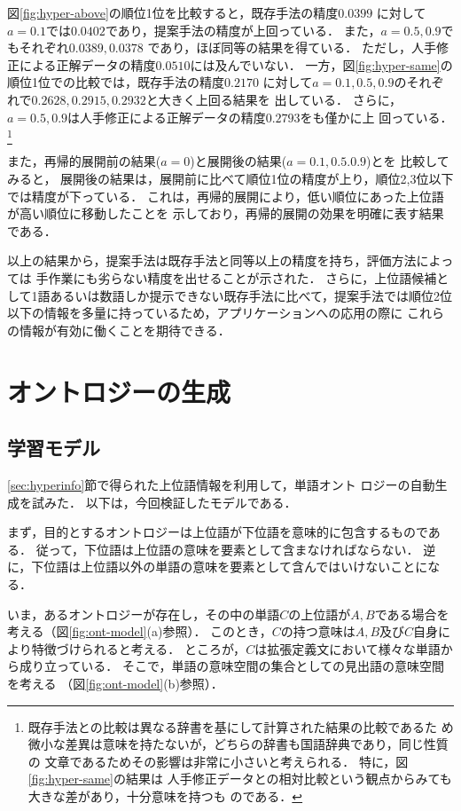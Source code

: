 \documentclass[japanese]{jnlp_1.4}
\begin{document}
図\ref{fig:hyper-above}の順位1位を比較すると，既存手法の精度$0.0399$
に対して$a=0.1$では$0.0402$であり，提案手法の精度が上回っている．
また，$a=0.5,0.9$でもそれぞれ$0.0389,0.0378$
であり，ほぼ同等の結果を得ている．
ただし，人手修正による正解データの精度$0.0510$には及んでいない．
一方，図\ref{fig:hyper-same}の順位1位での比較では，既存手法の精度$0.2170$
に対して$a=0.1,0.5,0.9$のそれぞれで$0.2628,0.2915,0.2932$と大きく上回る結果を
出している．
さらに，$a=0.5,0.9$は人手修正による正解データの精度$0.2793$をも僅かに上
回っている．\footnote{
既存手法との比較は異なる辞書を基にして計算された結果の比較であるた
め微小な差異は意味を持たないが，どちらの辞書も国語辞典であり，同じ性質の
文章であるためその影響は非常に小さいと考えられる．
特に，図\ref{fig:hyper-same}の結果は
人手修正データとの相対比較という観点からみても大きな差があり，十分意味を持つも
のである．}

また，再帰的展開前の結果($a=0$)と展開後の結果($a=0.1,0.5.0.9$)とを
比較してみると，
展開後の結果は，展開前に比べて順位1位の精度が上り，順位2,3位以下では精度が下っている．
これは，再帰的展開により，低い順位にあった上位語が高い順位に移動したことを
示しており，再帰的展開の効果を明確に表す結果である．

以上の結果から，提案手法は既存手法と同等以上の精度を持ち，評価方法によっては
手作業にも劣らない精度を出せることが示された．
さらに，上位語候補として1語あるいは数語しか提示できない既存手法に比べて，提案手法では順位2位以下の情報を多量に持っているため，アプリケーションへの応用の際に
これらの情報が有効に働くことを期待できる．

\section{オントロジーの生成}
\subsection{学習モデル}

\ref{sec:hyperinfo}節で得られた上位語情報を利用して，単語オント
ロジーの自動生成を試みた．
以下は，今回検証したモデルである．

まず，目的とするオントロジーは上位語が下位語を意味的に包含するものである．
従って，下位語は上位語の意味を要素として含まなければならない．
逆に，下位語は上位語以外の単語の意味を要素として含んではいけないことになる．

いま，あるオントロジーが存在し，その中の単語$C$の上位語が$A,B$である場合を考える（図\ref{fig:ont-model}(a)参照）．
このとき，$C$の持つ意味は$A,B$及び$C$自身により特徴づけられると考える．
ところが，$C$は拡張定義文において様々な単語から成り立っている．
そこで，単語の意味空間の集合としての見出語の意味空間を考える
（図\ref{fig:ont-model}(b)参照）．
\end{document}
